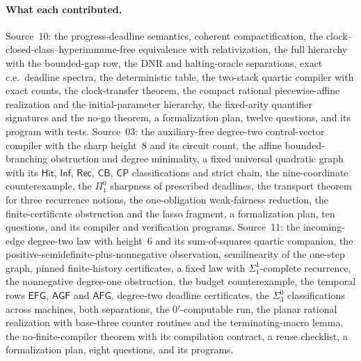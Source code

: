 \documentclass[11pt,letterpaper]{article}
\theoremstyle{definition}
\theoremstyle{remark}
\newcommand{\sig}[1]{\Sigma^{0}_{#1}}
\newcommand{\ppi}[1]{\Pi^{0}_{#1}}
\newcommand{\an}{\Sigma^{1}_{1}}
\newcommand{\CP}{\mathsf{CP}}
\newcommand{\CB}{\mathsf{CB}}
\newcommand{\REC}{\mathsf{Rec}}
\newcommand{\INF}{\mathsf{Inf}}
\newcommand{\HIT}{\mathsf{Hit}}
\newcommand{\EFG}{\mathsf{EFG}}
\newcommand{\AGF}{\mathsf{AGF}}
\newcommand{\AFG}{\mathsf{AFG}}
\newcommand{\1}{\mathbf 1}
\begin{document}
\paragraph{What each contributed.} Source~10: the progress-deadline semantics, coherent
compactification, the clock--closed-class--hyperimmune-free equivalence with relativization, the
full hierarchy with the bounded-gap row, the DNR and halting-oracle separations, exact c.e.\
deadline spectra, the deterministic table, the two-stack quartic compiler with exact counts, the
clock-transfer theorem, the compact rational piecewise-affine realization and the
initial-parameter hierarchy, the fixed-arity quantifier signatures and the no-go theorem, a
formalization plan, twelve questions, and its program 
with tests. Source~03: the auxiliary-free degree-two control-vector compiler with the sharp
height~$8$ and its circuit count, the affine bounded-branching obstruction and degree
minimality, a fixed universal quadratic graph with its $\HIT$, $\INF$, $\REC$, $\CB$, $\CP$
classifications and strict chain, the nine-coordinate counterexample, the $\ppi1$ sharpness of
prescribed deadlines, the transport theorem for three recurrence notions, the one-obligation
weak-fairness reduction, the finite-certificate obstruction and the lasso fragment, a
formalization plan, ten questions, and its compiler and verification programs. Source~11: the
incoming-edge degree-two law with height~$6$ and its sum-of-squares quartic companion, the
positive-semidefinite-plus-nonnegative observation, semilinearity of the one-step graph,
pinned finite-history certificates, a fixed law with $\an$-complete recurrence, the
nonnegative degree-one obstruction, the budget counterexample, the temporal rows $\EFG$, $\AGF$
and $\AFG$, degree-two deadline certificates, the $\sig3$ classifications across machines, both
separations, the $0'$-computable run, the planar rational realization with base-three counter
routines and the terminating-macro lemma, the no-finite-compiler theorem with its compilation
contract, a reuse checklist, a formalization plan, eight questions, and its programs.
\end{document}

